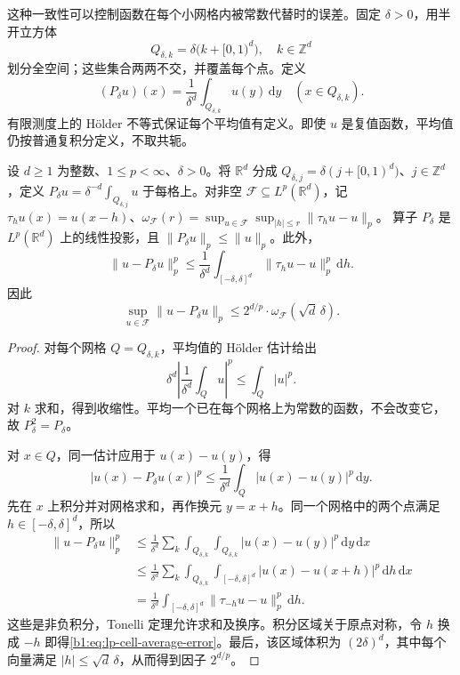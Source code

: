 这种一致性可以控制函数在每个小网格内被常数代替时的误差。固定 \(\delta>0\)，用半开立方体
\[
 Q_{\delta,k}=\delta\bigl(k+[0,1)^d\bigr),
 \quad k\in\mathbb Z^d
\]
划分全空间；这些集合两两不交，并覆盖每个点。定义
\[
 (P_\delta u)(x)=\frac1{\delta^d}\int_{Q_{\delta,k}}u(y)\,\mathrm dy
 \quad(x\in Q_{\delta,k}).
\]
有限测度上的 Hölder 不等式保证每个平均值有定义。即使 \(u\) 是复值函数，平均值仍按普通复积分定义，不取共轭。

\begin{lemma}\label{b1:lem:lp-cell-average}
设 \(d\geq1\) 为整数、\(1\leq p<\infty\)、\(\delta>0\)。将 \(\mathbb R^d\) 分成 \(Q_{\delta,j}=\delta(j+[0,1)^d)\)、\(j\in\mathbb Z^d\)，定义 \(P_\delta u=\delta^{-d}\int_{Q_{\delta,j}}u\) 于每格上。对非空 \(\mathcal F\subseteq L^p(\mathbb R^d)\)，记 \(\tau_hu(x)=u(x-h)\)、\(\omega_{\mathcal F}(r)=\sup_{u\in\mathcal F}\sup_{|h|\leq r}\|\tau_hu-u\|_p\)。
算子 \(P_\delta\) 是 \(L^p(\mathbb R^d)\) 上的线性投影，且
\(\|P_\delta u\|_p\leq\|u\|_p\)。此外，
\begin{equation}\label{b1:eq:lp-cell-average-error}
 \|u-P_\delta u\|_p^p
 \leq\frac1{\delta^d}
       \int_{[-\delta,\delta]^d}\|\tau_hu-u\|_p^p\,\mathrm dh.
\end{equation}
因此
\[
 \sup_{u\in\mathcal F}\|u-P_\delta u\|_p
 \leq2^{d/p}\cdot \omega_{\mathcal F}(\sqrt d\,\delta).
\]
\end{lemma}
\begin{proof}
对每个网格 \(Q=Q_{\delta,k}\)，平均值的 Hölder 估计给出
\[
 \delta^d\left|\frac1{\delta^d}\int_Q u\right|^p
 \leq\int_Q|u|^p.
\]
对 \(k\) 求和，得到收缩性。平均一个已在每个网格上为常数的函数，不会改变它，故 \(P_\delta^2=P_\delta\)。

对 \(x\in Q\)，同一估计应用于 \(u(x)-u(y)\)，得
\[
 |u(x)-P_\delta u(x)|^p
 \leq\frac1{\delta^d}\int_Q|u(x)-u(y)|^p\,\mathrm dy.
\]
先在 \(x\) 上积分并对网格求和，再作换元 \(y=x+h\)。同一个网格中的两个点满足 \(h\in[-\delta,\delta]^d\)，所以
\[
 \begin{aligned}
 \|u-P_\delta u\|_p^p
 &\leq\frac1{\delta^d}
      \sum_k\int_{Q_{\delta,k}}\int_{Q_{\delta,k}}
             |u(x)-u(y)|^p\,\mathrm dy\,\mathrm dx\\
 &\leq\frac1{\delta^d}
      \sum_k\int_{Q_{\delta,k}}\int_{[-\delta,\delta]^d}
             |u(x)-u(x+h)|^p\,\mathrm dh\,\mathrm dx\\
 &=\frac1{\delta^d}
      \int_{[-\delta,\delta]^d}\|\tau_{-h}u-u\|_p^p\,\mathrm dh.
 \end{aligned}
\]
这些是非负积分，Tonelli 定理允许求和及换序。积分区域关于原点对称，令 \(h\) 换成 \(-h\) 即得\eqref{b1:eq:lp-cell-average-error}。最后，该区域体积为 \((2\delta)^d\)，其中每个向量满足 \(|h|\leq\sqrt d\,\delta\)，从而得到因子 \(2^{d/p}\)。
\end{proof}

